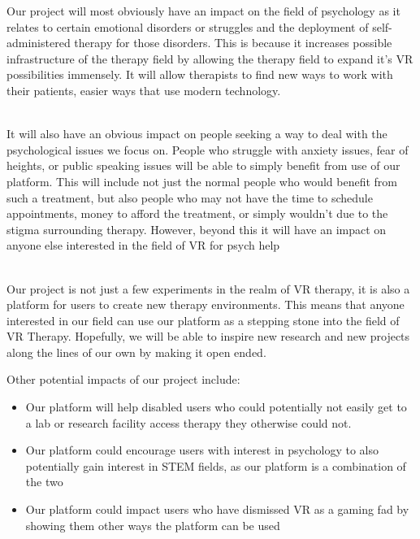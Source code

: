 \documentclass[a4paper,10pt]{article}
\begin{document}
	
	Our project will most obviously have an impact on the field of psychology as it relates to certain emotional disorders or struggles and the deployment of self-administered 
	therapy for those disorders.  This is because it increases possible infrastructure of the therapy field by allowing the therapy field to expand it's VR possibilities immensely.  It will allow therapists to find new ways to work with their patients, easier ways that use modern technology.
	\par ~\\
	It will also have an obvious impact on people seeking a way to deal with the psychological issues we focus on.  People who struggle with anxiety issues, fear of heights, or public speaking issues will be able to simply benefit from use of our platform.  This will include not just the normal people who would benefit from such a treatment, but also people who may not have the time to schedule appointments, money to afford the treatment, or simply wouldn't due to the stigma surrounding therapy.  However, beyond this it will have an impact on anyone else interested in the field of VR for psych help
	\par ~\\
	Our project is not just a few experiments in the realm of VR therapy, it is also a platform for users to create new therapy environments.  This means that anyone interested in our field can use our platform as a stepping stone into the field of VR Therapy.  Hopefully, we will be able to inspire new research and new projects along the lines of our own by making it open ended.
	\par 
	
	Other potential impacts of our project include:
	\begin{itemize}
		\item Our platform will help disabled users who could potentially not easily get to a lab or research facility access therapy they otherwise could not.
		\item Our platform could encourage users with interest in psychology to also potentially gain interest in STEM fields, as our platform is a combination of the two
		\item Our platform could impact users who have dismissed VR as a gaming fad by showing them other ways the platform can be used
	\end{itemize}
	\pagebreak
\end{document}

